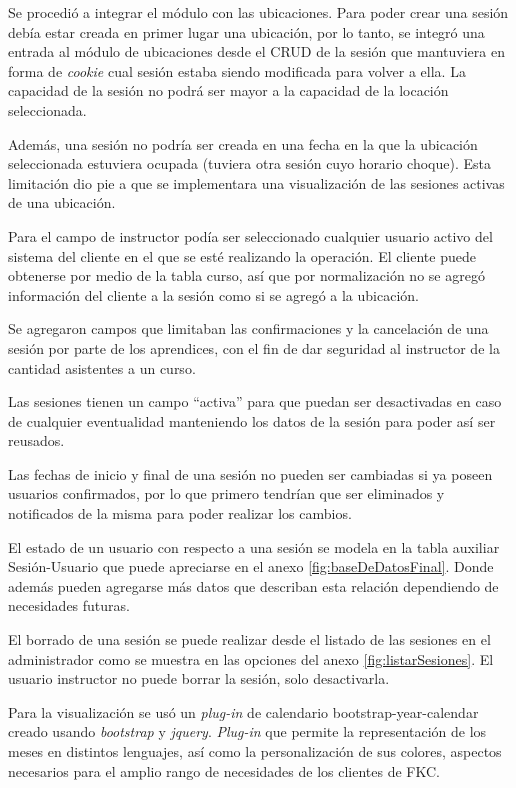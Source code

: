 	Se procedió a integrar el módulo con las ubicaciones. Para poder crear una sesión debía estar creada en primer lugar una ubicación, por lo tanto, se integró una entrada al módulo de ubicaciones desde el \gls{CRUD} de la sesión que mantuviera en forma de \emph{cookie} cual sesión estaba siendo modificada para volver a ella. La capacidad de la sesión no podrá ser mayor a la capacidad de la locación seleccionada.

	Además, una sesión no podría ser creada en una fecha en la que la ubicación seleccionada estuviera ocupada (tuviera otra sesión cuyo horario choque). Esta limitación dio pie a que se implementara una visualización de las sesiones activas de una ubicación.

	Para el campo de instructor podía ser seleccionado cualquier usuario activo del sistema del cliente en el que se esté realizando la operación. El cliente puede obtenerse por medio de la tabla curso, así que por normalización no se agregó información del cliente a la sesión como si se agregó a la ubicación.

	Se agregaron campos que limitaban las confirmaciones y la cancelación de una sesión por parte de los aprendices, con el fin de dar seguridad al instructor de la cantidad asistentes a un curso.

	Las sesiones tienen un campo ``activa'' para que puedan ser desactivadas en caso de cualquier eventualidad manteniendo los datos de la sesión para poder así ser reusados.

	Las fechas de inicio y final de una sesión no pueden ser cambiadas si ya poseen usuarios confirmados, por lo que primero tendrían que ser eliminados y notificados de la misma para poder realizar los cambios.

	El estado de un usuario con respecto a una sesión se modela en la tabla auxiliar Sesión-Usuario que puede apreciarse en el anexo \ref{fig:baseDeDatosFinal}. Donde además pueden agregarse más datos que describan esta relación dependiendo de necesidades futuras.

	El borrado de una sesión se puede realizar desde el listado de las sesiones en el administrador como se muestra en las opciones del anexo \ref{fig:listarSesiones}. El usuario instructor no puede borrar la sesión, solo desactivarla.

	Para la visualización se usó un \emph{plug-in} de calendario bootstrap-year-calendar creado usando \emph{bootstrap} y \emph{jquery}. \emph{Plug-in} que permite la representación de los meses en distintos lenguajes, así como la personalización de sus colores, aspectos necesarios para el amplio rango de necesidades de los clientes de FKC.

